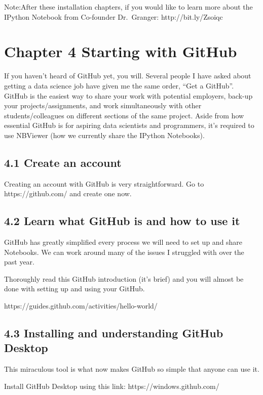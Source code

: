 \documentclass{article}
\begin{document}
Note:After these installation chapters, if you would like to learn more
about the IPython Notebook from Co-founder Dr.~Granger:
http://bit.ly/Zsoiqc 


    \section{Chapter 4 Starting with GitHub}


    If you haven't heard of GitHub yet, you will. Several people I have
asked about getting a data science job have given me the same order,
``Get a GitHub''. GitHub is the easiest way to share your work with
potential employers, back-up your projects/assignments, and work
simultaneously with other students/colleagues on different sections of
the same project. Aside from how essential GitHub is for aspiring data
scientists and programmers, it's required to use NBViewer (how we
currently share the IPython Notebooks).


    \subsection{4.1 Create an account}


    Creating an account with GitHub is very straightforward. Go to
https://github.com/ and create one now.


    \subsection{4.2 Learn what GitHub is and how to use it}


    GitHub has greatly simplified every process we will need to set up and
share Notebooks. We can work around many of the issues I struggled with
over the past year.

Thoroughly read this GitHub introduction (it's brief) and you will
almost be done with setting up and using your GitHub.

https://guides.github.com/activities/hello-world/


    \subsection{4.3 Installing and understanding GitHub Desktop}


    This miraculous tool is what now makes GitHub so simple that anyone can
use it.

Install GitHub Desktop using this link: https://windows.github.com/
\end{document}
